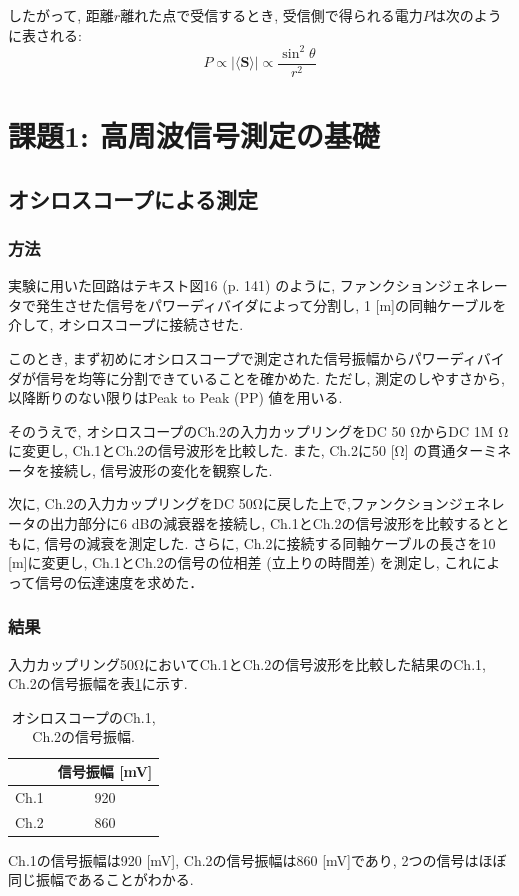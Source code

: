 \documentclass[uplatex,dvipdfmx,a4j,12pt]{jsarticle}
\begin{document}
したがって, 距離$r$離れた点で受信するとき, 受信側で得られる電力$P$は次のように表される:
\begin{equation}
  P \propto |\langle \mathbf{S} \rangle| \propto \frac{\sin^2\theta}{r^2}
\end{equation}

\section{課題1: 高周波信号測定の基礎}
\subsection{オシロスコープによる測定}
\subsubsection{方法}
実験に用いた回路はテキスト図16 (p. 141) のように, ファンクションジェネレータで発生させた信号をパワーディバイダによって分割し, 1 [m]の同軸ケーブルを介して, オシロスコープに接続させた.

このとき, まず初めにオシロスコープで測定された信号振幅からパワーディバイダが信号を均等に分割できていることを確かめた.
ただし, 測定のしやすさから, 以降断りのない限りはPeak to Peak (PP) 値を用いる.

そのうえで, オシロスコープのCh.2の入力カップリングをDC 50 \si{\ohm}からDC 1M \si{\ohm}に変更し, Ch.1とCh.2の信号波形を比較した.
また, Ch.2に50 [\si{\ohm}] の貫通ターミネータを接続し, 信号波形の変化を観察した.

次に, Ch.2の入力カップリングをDC 50\si{\ohm}に戻した上で,ファンクションジェネレータの出力部分に6 dBの減衰器を接続し, Ch.1とCh.2の信号波形を比較するとともに, 信号の減衰を測定した.
さらに, Ch.2に接続する同軸ケーブルの長さを10 [m]に変更し, Ch.1とCh.2の信号の位相差 (立上りの時間差) を測定し, これによって信号の伝達速度を求めた．



\subsubsection{結果}
入力カップリング50\si{\ohm}においてCh.1とCh.2の信号波形を比較した結果のCh.1, Ch.2の信号振幅を表\ref{table:1-1-1}に示す.
\begin{table}[h]
    \centering
    \caption{オシロスコープのCh.1, Ch.2の信号振幅.}
    \label{table:1-1-1}
    \begin{tabular}{cc}
        \hline
        & 信号振幅 [mV]\\
        \hline\hline
        Ch.1 & 920  \\
        Ch.2 & 860  \\
        \hline
    \end{tabular}
\end{table}
Ch.1の信号振幅は920 [mV], Ch.2の信号振幅は860 [mV]であり, 2つの信号はほぼ同じ振幅であることがわかる.
\end{document}
